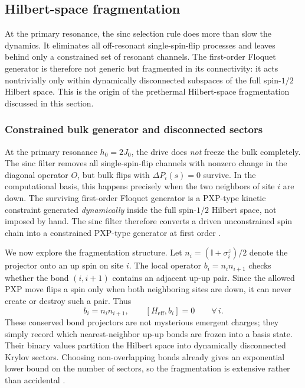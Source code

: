 \documentclass[aps,prb,reprint,twocolumn,amsmath,amssymb,citeautoscript]{revtex4-2}
\begin{document}
\subsection{Hilbert-space fragmentation}
\label{sec:hsf}
At the primary resonance, the sinc selection rule does more than slow the dynamics. It eliminates all off-resonant single-spin-flip processes and leaves behind only a constrained set of resonant channels. The first-order Floquet generator is therefore not generic but fragmented in its connectivity: it acts nontrivially only within dynamically disconnected subspaces of the full spin-$1/2$ Hilbert space. This is the origin of the prethermal Hilbert-space fragmentation discussed in this section.
\subsubsection{Constrained bulk generator and disconnected sectors}

At the primary resonance $h_0=2J_0$, the drive does \textit{not} freeze the bulk completely. The sinc filter removes all single-spin-flip channels with nonzero change in the diagonal operator $O$, but bulk flips with $\Delta P_i(s)=0$ survive. In the computational basis, this happens precisely when the two neighbors of site $i$ are down. The surviving first-order Floquet generator is a PXP-type kinetic constraint generated \textit{dynamically} inside the full spin-$1/2$ Hilbert space, not imposed by hand. The sinc filter therefore converts a driven unconstrained spin chain into a constrained PXP-type generator at first order \cite{Sala2020PRX,Khemani2020PRBShattering,MoudgalyaMotrunich2022PRX,MoudgalyaBernevigRegnault2022RPP,Ghosh2023PRL,Ghosh2024PRB,Zhang2024StarkHSF}.

We now explore the fragmentation structure. Let $n_i=(\mathbb{I}+\sigma_i^z)/2$ denote the projector onto an up spin on site $i$. The local operator $b_i=n_in_{i+1}$ checks whether the bond $(i,i+1)$ contains an adjacent up-up pair. Since the allowed PXP move flips a spin only when both neighboring sites are down, it can never create or destroy such a pair. Thus
\begin{equation}
b_i=n_in_{i+1},
\qquad
[H_{\mathrm{eff}},b_i]=0
\qquad \forall\, i.
\label{eq:bi_frag_main}
\end{equation}
These conserved bond projectors are not mysterious emergent charges; they simply record which nearest-neighbor up-up bonds are frozen into a basis state. Their binary values partition the Hilbert space into dynamically disconnected Krylov sectors. Choosing non-overlapping bonds already gives an exponential lower bound on the number of sectors, so the fragmentation is extensive rather than accidental \cite{Khemani2020PRBShattering,MoudgalyaMotrunich2022PRX}.
\end{document}

